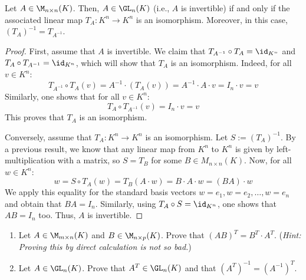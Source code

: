 \begin{proposition}
\label{prop:invertibility_isomorphism_equivalence}
Let $A \in \M_{n \times n}(K)$. Then, $A \in \GL_n(K)$ (i.e., $A$ is invertible) if and only if the associated linear map $T_A: K^n \to K^n$ is an isomorphism. Moreover, in this case, $(T_A)^{-1} = T_{A^{-1}}$.
\end{proposition}

\begin{proof}
First, assume that $A$ is invertible. We claim that $T_{A^{-1}} \circ T_A = \id_{K^n}$ and $T_A \circ T_{A^{-1}} = \id_{K^n}$, which will show that $T_A$ is an isomorphism. Indeed, for all $v \in K^n$:
\begin{equation*}
    T_{A^{-1}} \circ T_A(v) = A^{-1} \cdot (T_A(v)) = A^{-1} \cdot A \cdot v = I_n \cdot v = v
\end{equation*}
Similarly, one shows that for all $v \in K^n$:
\begin{equation*}
    T_A \circ T_{A^{-1}}(v) = I_n \cdot v = v
\end{equation*}
This proves that $T_A$ is an isomorphism.

Conversely, assume that $T_A: K^n \to K^n$ is an isomorphism. Let $S := (T_A)^{-1}$. By a previous result, we know that any linear map from $K^n$ to $K^n$ is given by left-multiplication with a matrix, so $S = T_B$ for some $B \in M_{n \times n}(K)$. Now, for all $w \in K^n$:
\begin{equation*}
    w = S \circ T_A(w) = T_B(A \cdot w) = B \cdot A \cdot w = (BA) \cdot w
\end{equation*}
We apply this equality for the standard basis vectors $w = e_1, w = e_2, \dots, w = e_n$ and obtain that $BA = I_n$. Similarly, using $T_A \circ S = \id_{K^n}$, one shows that $AB = I_n$ too. Thus, $A$ is invertible.
\end{proof}

\begin{exercise}
\begin{enumerate}
    \item Let $A \in \M_{m \times n}(K)$ and $B \in \M_{n \times p}(K)$. Prove that $(AB)^T = B^T \cdot A^T$. \newline (\textit{Hint: Proving this by direct calculation is not so bad.})
    \item Let $A \in \GL_n(K)$. Prove that $A^T \in \GL_n(K)$ and that $(A^T)^{-1} = (A^{-1})^T$.
\end{enumerate}
\end{exercise}

